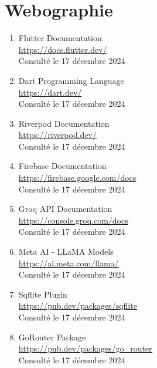 \documentclass[12pt,a4paper]{report}
\begin{document}
\chapter*{Webographie}

\begin{enumerate}
    \item Flutter Documentation \\
    \url{https://docs.flutter.dev/} \\
    Consulté le 17 décembre 2024
    
    \item Dart Programming Language \\
    \url{https://dart.dev/} \\
    Consulté le 17 décembre 2024
    
    \item Riverpod Documentation \\
    \url{https://riverpod.dev/} \\
    Consulté le 17 décembre 2024
    
    \item Firebase Documentation \\
    \url{https://firebase.google.com/docs} \\
    Consulté le 17 décembre 2024
    
    \item Groq API Documentation \\
    \url{https://console.groq.com/docs} \\
    Consulté le 17 décembre 2024
    
    \item Meta AI - LLaMA Models \\
    \url{https://ai.meta.com/llama/} \\
    Consulté le 17 décembre 2024
    
    \item Sqflite Plugin \\
    \url{https://pub.dev/packages/sqflite} \\
    Consulté le 17 décembre 2024
    
    \item GoRouter Package \\
    \url{https://pub.dev/packages/go_router} \\
    Consulté le 17 décembre 2024
    

\end{enumerate}
\end{document}

